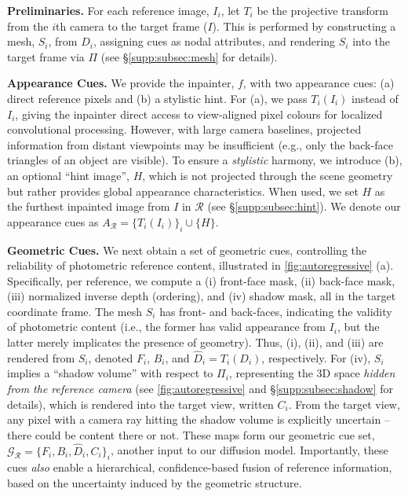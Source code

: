 \noindent\textbf{Preliminaries.}
For each reference image, $I_i$, let $T_i$ be the projective transform from the $i$th camera to the target frame ($I$).
This is performed by constructing a mesh, $S_i$, from $D_i$,
assigning cues as nodal attributes,
and rendering $S_i$ into the target frame via $\Pi$ (see \S\ref{supp:subsec:mesh} for details).

\noindent\textbf{Appearance Cues.}
We provide the inpainter, $f$, with two appearance cues:
(a) direct reference pixels and (b) a stylistic hint.
For (a), we
pass $T_i(I_i)$
instead of $I_i$,
giving
the inpainter direct access to view-aligned pixel
colours for localized convolutional processing.
However, with large camera baselines, projected information from distant viewpoints may be insufficient 
(e.g., 
only the back-face triangles of an object are visible).
To ensure a \textit{stylistic} harmony, we introduce (b), an optional ``hint image'', $H$, which is not projected through the scene geometry but rather provides global appearance characteristics.
When used, we set $H$ as the furthest inpainted image from $I$ in $\mathcal{R}$ (see \S\ref{supp:subsec:hint}).
We denote our appearance cues as
$A_{\mathcal{R}} = \{ T_i(I_i) \}_i \cup \{ H \}$.



\noindent\textbf{Geometric Cues.}
We next obtain a set of geometric cues, controlling
the
reliability
of photometric reference content,
illustrated in \cref{fig:autoregressive} (a).
Specifically, per reference, we compute a
(i) front-face mask,
(ii) back-face mask,
(iii) normalized inverse depth (ordering),
and
(iv) shadow mask,
all in the target coordinate frame.
The mesh $S_i$ has front- and back-faces, indicating the validity of photometric content (i.e., the former has valid appearance from $I_i$, but the latter merely implicates the presence of geometry).
Thus, (i), (ii), and (iii) are 
rendered from
$S_i$,
denoted $F_i$, $B_i$, and $\widehat{D}_i = T_i(D_i)$, respectively.
For (iv), $S_i$ implies a ``shadow volume'' \cite{mccool2000shadow,haller2003real} with respect to $\Pi_i$, 
representing
the 3D space \textit{hidden from the reference camera} 
(see \cref{fig:autoregressive} and \S\ref{supp:subsec:shadow} for details),
which 
is rendered
into the target view, written $C_{i}$.
From the target view, any pixel with a camera ray hitting the shadow volume is explicitly uncertain -- there could be content there or not.
These maps
form
our geometric cue set,
$ \mathcal{G}_\mathcal{R} = \{ F_i, B_i, \widehat{D}_i, C_i \}_i $,
another input to our diffusion model.
Importantly, these cues \textit{also} enable a {hierarchical, confidence-based} fusion of reference information, based on the uncertainty induced by the geometric structure.




